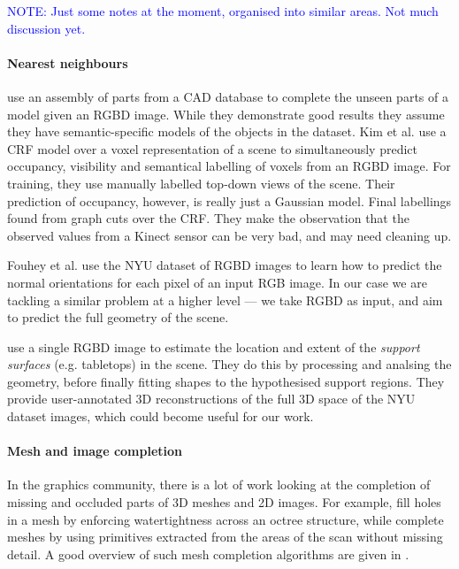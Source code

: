 \documentclass[10pt,twocolumn,letterpaper]{article}
\makeatletter
\renewcommand*{\eg}{e.g.\@\xspace}
\newcommand*{\ea}{et al.\@\xspace}
\newcommand{\note}[1]{\textcolor{blue}{NOTE: #1}}
\makeatother
\begin{document}
\note{Just some notes at the moment, organised into similar areas. Not much discussion yet.}



\paragraph{Nearest neighbours}
\cite{shen-tog-2012} use an assembly of parts from a CAD database to complete the unseen parts of a model given an RGBD image. 
While they demonstrate good results they assume they have semantic-specific models of the objects in the dataset.
Kim \ea \cite{kim-iccv-2013} use a CRF model over a voxel representation of a scene to simultaneously predict occupancy, visibility and semantical labelling of voxels from an RGBD image. 
For training, they use manually labelled top-down views of the scene. 
Their prediction of occupancy, however, is really just a Gaussian model. 
Final labellings found from graph cuts over the CRF. 
They make the observation that the observed values from a Kinect sensor can be very bad, and may need cleaning up.

Fouhey \ea \cite{fouhey-iccv-2013} use the NYU dataset of RGBD images to learn how to predict the normal orientations for each pixel of an input RGB image. 
In our case we are tackling a similar problem at a higher level --- we take RGBD as input, and aim to predict the full geometry of the scene.

\cite{guo-iccv-2013} use a single RGBD image to estimate the location and extent of the \emph{support surfaces} (\eg tabletops) in the scene. They do this by processing and analsing the geometry, before finally fitting shapes to the hypothesised support regions. They provide user-annotated 3D reconstructions of the full 3D space of the NYU dataset images, which could become useful for our work.


\paragraph{Mesh and image completion}
In the graphics community, there is a lot of work looking at the completion of missing and occluded parts of 3D meshes and 2D images. 
For example, \cite{podolak-esgp-2005} fill holes in a mesh by enforcing watertightness across an octree structure, while \cite{schnabel-eurographics-2009} complete meshes by using primitives extracted from the areas of the scan without missing detail. 
A good overview of such mesh completion algorithms are given in \cite{ju-cst-2009}.
\end{document}
